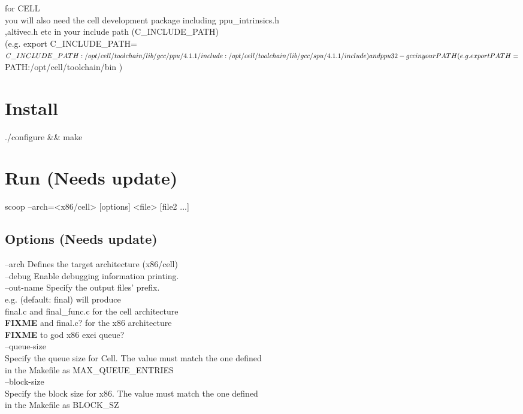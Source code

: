 \documentclass[letterpaper]{article}
\begin{document}
for CELL\\
  you will also need the cell development package including ppu\_intrinsics.h\\
  ,altivec.h etc in your include path (C\_INCLUDE\_PATH)\\
  (e.g. export C\_INCLUDE\_PATH=$C\_INCLUDE\_PATH:/opt/cell/toolchain/lib/gcc/ppu/4.1.1/include:/opt/cell/toolchain/lib/gcc/spu/4.1.1/include )\\
  and ppu32-gcc in your PATH\\
  (e.g. export PATH=$PATH:/opt/cell/toolchain/bin )\\

\section{Install}

  ./configure \&\& make

\section{Run (Needs update)}

  scoop --arch=<x86/cell> [options] <file> [file2 ...]

\subsection{Options (Needs update)}

  --arch  Defines the target architecture (x86/cell)\\

  --debug Enable debugging information printing.\\

  --out-name Specify the output files' prefix.\\
          e.g. (default: final) will produce \\
          final.c and final\_func.c for the cell architecture\\
\textbf{FIXME}         and final.c? for the x86 architecture\\

\textbf{FIXME} to god x86 exei queue?\\
  --queue-size\\
          Specify the queue size for Cell. The value must match the one defined\\
          in the Makefile as MAX\_QUEUE\_ENTRIES\\

  --block-size\\
          Specify the block size for x86.  The value must match the one defined\\
          in the Makefile as BLOCK\_SZ\\
\end{document}
